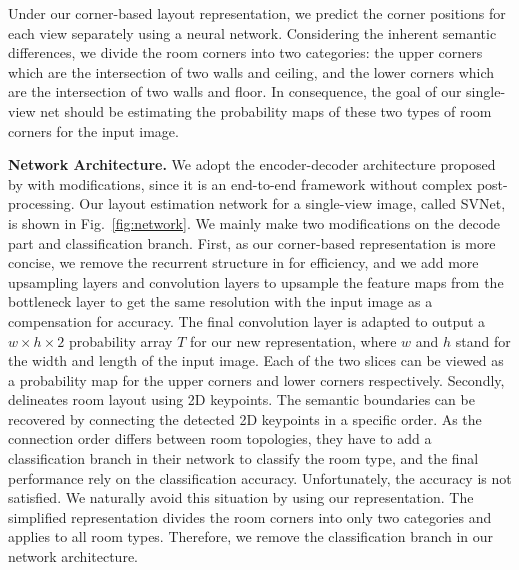 %
 
 
Under our corner-based layout representation, we predict the corner positions for each view separately using a neural network. 
Considering the inherent semantic differences, we divide the room corners into two categories: the upper corners which are the intersection of two walls and ceiling, and the lower corners which are the intersection of two walls and floor. 
In consequence, the goal of our single-view net should be estimating the probability maps of these two types of room corners for the input image.

\noindent\textbf{Network Architecture.}
We adopt the encoder-decoder architecture proposed by \cite{LeeRoomNet17} with modifications, since it is an end-to-end framework without complex post-processing. 
%
Our layout estimation network for a single-view image, called SVNet, is shown in Fig.~\ref{fig:network}. 
We mainly make two modifications on the decode part and classification branch. 
First, as our corner-based representation is more concise, we remove the recurrent structure in \cite{LeeRoomNet17} for efficiency, and we add more upsampling layers and convolution layers to upsample the feature maps from the bottleneck layer to get the same resolution with the input image as a compensation for accuracy. 
The final convolution layer is adapted to output a $w \times h \times 2$ probability array $T$ for our new representation, where $w$ and $h$ stand for the width and length of the input image. 
Each of the two slices can be viewed as a probability map for the upper corners and lower corners respectively. 
Secondly, \cite{LeeRoomNet17} delineates room layout using 2D keypoints. The semantic boundaries can be recovered by connecting the detected 2D keypoints in a specific order. As the connection order differs between room topologies, they have to add a classification branch in their network to classify the room type, and the final performance rely on the classification accuracy. 
Unfortunately, the accuracy is not satisfied. 
We naturally avoid this situation by using our representation. The simplified representation divides the room corners into only two categories and applies to all room types. 
Therefore, we remove the classification branch in our network architecture.
 
